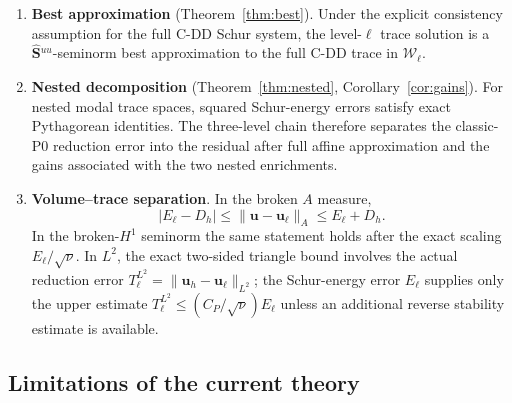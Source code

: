 \documentclass[11pt,a4paper]{article}
\theoremstyle{definition}
\newcommand{\vel}{\bm{u}}
\newcommand{\Schur}{\mathbf{S}}
\newcommand{\Shatuu}{\widehat{\Schur}{}^{uu}}
\newcommand{\Wspace}{\mathcal{W}}
\begin{document}
\begin{enumerate}[leftmargin=*,itemsep=4pt]
  \item \textbf{Best approximation} (Theorem~\ref{thm:best}).
    Under the explicit consistency assumption for the full C-DD Schur
    system, the level-$\ell$ trace solution is a
    $\Shatuu$-seminorm best approximation to the full C-DD trace in
    $\Wspace_\ell$.
  \item \textbf{Nested decomposition} (Theorem~\ref{thm:nested},
    Corollary~\ref{cor:gains}).
    For nested modal trace spaces, squared Schur-energy errors satisfy
    exact Pythagorean identities.  The three-level chain therefore
    separates the classic-P0 reduction error into the residual after
    full affine approximation and the gains associated with the two
    nested enrichments.
  \item \textbf{Volume--trace separation}.
    In the broken $A$ measure,
    \[
      |E_\ell-D_h|\le\|\vel-\vel_\ell\|_A\le E_\ell+D_h.
    \]
    In the broken-$H^1$ seminorm the same statement holds after the
    exact scaling $E_\ell/\sqrt{\nu}$.  In $L^2$, the exact two-sided
    triangle bound involves the actual reduction error
    $T_\ell^{L^2}=\|\vel_h-\vel_\ell\|_{L^2}$; the Schur-energy error
    $E_\ell$ supplies only the upper estimate
    $T_\ell^{L^2}\le(C_P/\sqrt{\nu})E_\ell$ unless an additional
    reverse stability estimate is available.
\end{enumerate}

\subsection{Limitations of the current theory}
\end{document}

